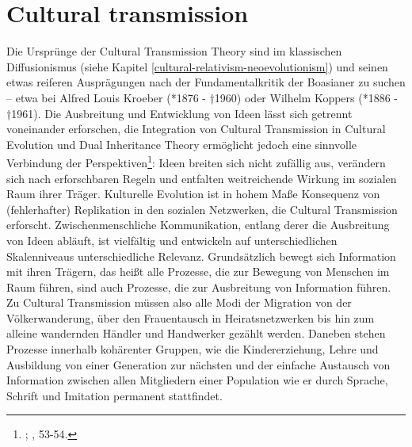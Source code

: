 \documentclass[openany,twoside,twocolumn]{book}
\let\rmarkdownfootnote\footnote%
\def\footnote{\protect\rmarkdownfootnote}
\begin{document}
\hypertarget{cultural-transmission}{%
\section{Cultural transmission}\label{cultural-transmission}}

Die Ursprünge der Cultural Transmission Theory sind im klassischen
Diffusionismus (siehe Kapitel \ref{cultural-relativism-neoevolutionism})
und seinen etwas reiferen Ausprägungen nach der Fundamentalkritik der
Boasianer zu suchen -- etwa bei Alfred Louis Kroeber (*1876 - †1960)
oder Wilhelm Koppers (*1886 - †1961). Die Ausbreitung und Entwicklung
von Ideen lässt sich getrennt voneinander erforschen, die Integration
von Cultural Transmission in Cultural Evolution und Dual Inheritance
Theory ermöglicht jedoch eine sinnvolle Verbindung der
Perspektiven\footnote{\textcite{eerkens_cultural_2007};
  \textcite{cavalli-sforza_cultural_1981}, 53-54.}: Ideen breiten sich
nicht zufällig aus, verändern sich nach erforschbaren Regeln und
entfalten weitreichende Wirkung im sozialen Raum ihrer Träger.
Kulturelle Evolution ist in hohem Maße Konsequenz von (fehlerhafter)
Replikation in den sozialen Netzwerken, die Cultural Transmission
erforscht. Zwischenmenschliche Kommunikation, entlang derer die
Ausbreitung von Ideen abläuft, ist vielfältig und entwickeln auf
unterschiedlichen Skalenniveaus unterschiedliche Relevanz. Grundsätzlich
bewegt sich Information mit ihren Trägern, das heißt alle Prozesse, die
zur Bewegung von Menschen im Raum führen, sind auch Prozesse, die zur
Ausbreitung von Information führen. Zu Cultural Transmission müssen also
alle Modi der Migration von der Völkerwanderung, über den Frauentausch
in Heiratsnetzwerken bis hin zum alleine wandernden Händler und
Handwerker gezählt werden. Daneben stehen Prozesse innerhalb kohärenter
Gruppen, wie die Kindererziehung, Lehre und Ausbildung von einer
Generation zur nächsten und der einfache Austausch von Information
zwischen allen Mitgliedern einer Population wie er durch Sprache,
Schrift und Imitation permanent stattfindet.
\end{document}
